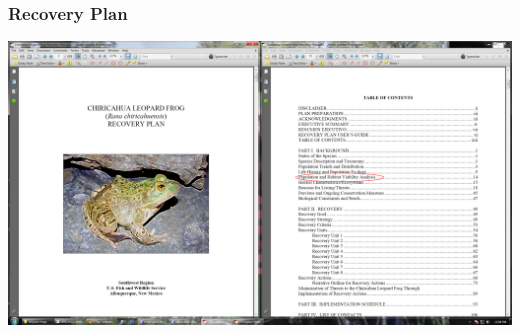 \documentclass[color=usenames,dvipsnames]{beamer}
\begin{document}
\begin{frame}
  \frametitle{Recovery Plan}
  \begin{center}
    \includegraphics[width=\textwidth]{figs/lich-recovery-plan}
  \end{center}
\end{frame}
\end{document}
